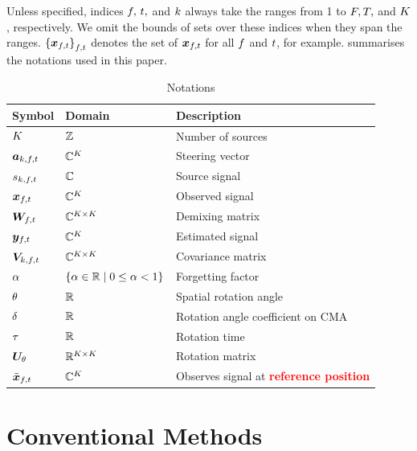 \documentclass[sip,biber]{now-journal}
\begin{document}
Unless specified, indices $f,\, t,$ and $k$ always take the ranges from 1 to $F, T,$ and $K$, respectively.
We omit the bounds of sets over these indices when they span the ranges.
${\{\Obs _{\ft}\}}_{\ft}$ denotes the set of $\Obs _{\ft}$ for all $f$ and $t$, for example.
 summarises the notations used in this paper.
\begin{table}[t]
  \centering
  \caption{Notations}\label{tab:notations}
  \begin{tabular}{lll}
    \toprule
      Symbol & Domain & Description \\
    \midrule
      $K$               & $\mathbb{Z}$                     & Number of sources \\
      $\steer _{\src,\ft}$ & $\mathbb{C} ^{K}$             & Steering vector \\
      $\sig _{\src,\ft}$   & $\mathbb{C}$                     & Source signal \\
      $\Obs _{\ft}$        & $\mathbb{C}^{K}$              & Observed signal \\
      $\Demix _{\ft}$      & $\mathbb{C}^{K \times K}$  & Demixing matrix \\
      $\Est _{\ft}$        & $\mathbb{C}^{K}$              & Estimated signal \\
      $\cov _{\src,\ft}$   & $\mathbb{C}^{K \times K}$  & Covariance matrix \\
      $\alpha$            & $\{\alpha \in \mathbb{R} \mid 0 \leq \alpha < 1\}$   & Forgetting factor \\
      $\theta$           & $\mathbb{R}$                     & Spatial rotation angle \\
      $\delta$           & $\mathbb{R}$                     & Rotation angle coefficient on CMA \\
      $\tau$            & $\mathbb{R}$                     & Rotation time \\
      $\bm{U} _{\theta}$ & $\mathbb{R} ^{K \times K}$ & Rotation matrix \\
      $\refpos{\Obs} _{\ft}$ & $\mathbb{C}^{K}$              & Observes signal at \textcolor{red}{\textbf{reference position}} \\
    \bottomrule
  \end{tabular}
\end{table}

\section{Conventional Methods}\label{sec:conventional}
\end{document}
